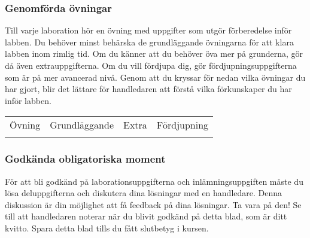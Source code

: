 


\subsubsection*{Genomförda övningar}

\vspace{1em}\noindent 
{Till varje laboration hör en övning med uppgifter som utgör förberedelse inför labben. Du behöver minst behärska de grundläggande övningarna för att klara labben inom rimlig tid. Om du känner att du behöver öva mer på grunderna, gör då även extrauppgifterna. Om du vill fördjupa dig, gör fördjupningsuppgifterna som är på mer avancerad nivå. Genom att du kryssar för nedan vilka övningar du har gjort, blir det lättare för handledaren att förstå vilka förkunskaper du har inför labben.}

\newcommand{\TickBox}{\raisebox{-.50ex}{\Large$\square$}}
\newcommand{\ExeRow}[1]{\texttt{#1} & \TickBox  &  \TickBox &  \TickBox  \\ \addlinespace }

\begin{table}[h]
\centering
\vspace{2em}
\begin{tabular}{lccc}
\toprule \addlinespace 
{\sffamily\small Övning} & 
{\sffamily\small Grundläggande} &	
{\sffamily\small Extra} &
{\sffamily\small Fördjupning}\\ \addlinespace \midrule \\[-0.7em]

\bottomrule
\end{tabular}
\end{table}

\newpage

\subsubsection*{Godkända obligatoriska moment}

\vspace{1em}\noindent 
För att bli godkänd på laborationsuppgifterna och inlämningsuppgiften måste du lösa deluppgifterna och diskutera dina lösningar med en handledare. Denna diskussion är din möjlighet att få feedback på dina lösningar. Ta vara på den!
Se till att handledaren noterar när du blivit godkänd på detta blad, som är ditt kvitto. Spara detta blad tills du fått slutbetyg i kursen. 


